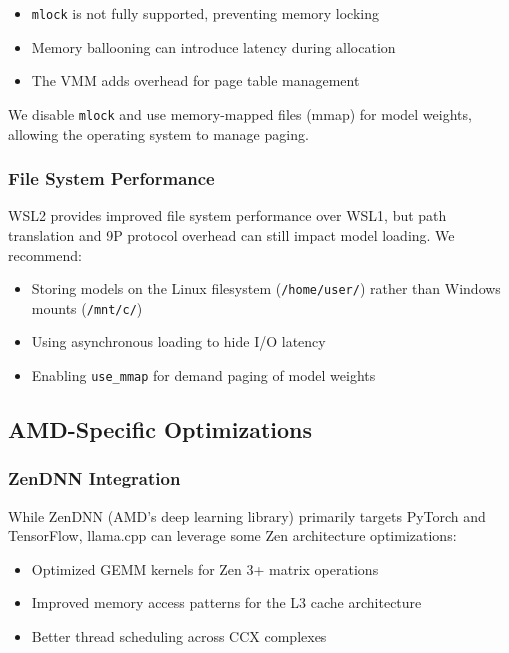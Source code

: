 \begin{itemize}
    \item \texttt{mlock} is not fully supported, preventing memory locking
    \item Memory ballooning can introduce latency during allocation
    \item The VMM adds overhead for page table management
\end{itemize}

We disable \texttt{mlock} and use memory-mapped files (mmap) for model weights, allowing the operating system to manage paging.

\subsubsection{File System Performance}

WSL2 provides improved file system performance over WSL1, but path translation and 9P protocol overhead can still impact model loading. We recommend:

\begin{itemize}
    \item Storing models on the Linux filesystem (\texttt{/home/user/}) rather than Windows mounts (\texttt{/mnt/c/})
    \item Using asynchronous loading to hide I/O latency
    \item Enabling \texttt{use\_mmap} for demand paging of model weights
\end{itemize}

\subsection{AMD-Specific Optimizations}

\subsubsection{ZenDNN Integration}

While ZenDNN (AMD's deep learning library) primarily targets PyTorch and TensorFlow, llama.cpp can leverage some Zen architecture optimizations:

\begin{itemize}
    \item Optimized GEMM kernels for Zen 3+ matrix operations
    \item Improved memory access patterns for the L3 cache architecture
    \item Better thread scheduling across CCX complexes
\end{itemize}

